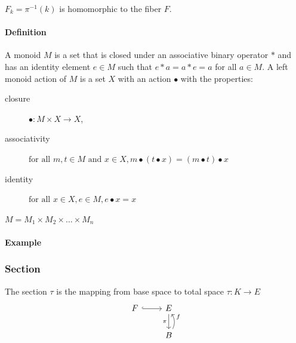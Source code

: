 \documentclass[../main.tex]{subfiles}
\begin{document}

$F_k = \pi^{-1}({k}) $ is homomorphic to the fiber $F$.


\paragraph{Definition}
A monoid\cite{Monoid2021} $M$ is a set that is closed under an associative binary operator $\ast$ and has an identity element $e\in M$ such that $e\ast a= a \ast e = a$ for all $a \in M$. A left monoid action \cite{SemigroupAction2021,ActionNLab} of $M$ is a set $X$ with an action $\bullet$ with the properties:
\begin{description}
    \item[closure] $\bullet: M\times X \rightarrow X$,
    \item[associativity] $\text{for all } m,t \in M \text{ and } x\in X, m\bullet(t\bullet x) = (m\bullet t) \bullet x$
    \item[identity] $\text{for all } x\in X, e\in M,  e\bullet x = x$ 
\end{description} 


$M = M_{1} \times M_{2} \times \ldots \times M_{n}$

\paragraph{Example}



\subsubsection{Section}
\label{sec:section_data}
The section $\tau$ is the mapping from base space to total space $\tau: K\rightarrow E$ 
\begin{equation}
    \label{eq:section}
    \begin{tikzcd}
        F \arrow[r, hook] & E \arrow[d, "\pi"']           \\
        & B \arrow[u, "f"', bend right]
    \end{tikzcd}
\end{equation}
\end{document}
